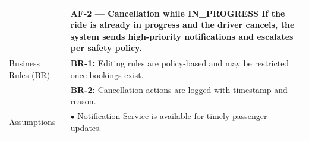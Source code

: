 \begin{longtable}{|>{\raggedright\arraybackslash}p{4cm}|>{\raggedright\arraybackslash}p{11cm}|}
& \textbf{AF-2 — Cancellation while IN\_PROGRESS} \newline If the ride is already in progress and the driver cancels, the system sends high-priority notifications and escalates per safety policy. \\
\hline
Business Rules (BR) & \textbf{BR-1:} Editing rules are policy-based and may be restricted once bookings exist. \\
& \textbf{BR-2:} Cancellation actions are logged with timestamp and reason. \\
\hline
Assumptions & $\bullet$ Notification Service is available for timely passenger updates. \\
\end{longtable}

